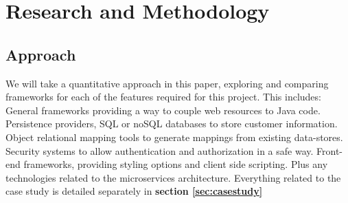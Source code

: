 \documentclass[12pt]{article}
\begin{document}
\section{Research and Methodology}
\begin{multicols}{2}
\subsection{Approach}
We will take a quantitative approach in this paper, exploring and comparing frameworks for each of the features required for this project. This includes: General frameworks providing a way to couple web resources to Java code. Persistence providers, SQL or noSQL databases to store customer information. Object relational mapping tools to generate mappings from existing data-stores. Security systems to allow authentication and authorization in a safe way. Front-end frameworks, providing styling options and client side scripting. Plus any technologies related to the microservices architecture. Everything related to the case study is detailed separately in \textbf{section \ref{sec:casestudy}}

\end{multicols}
\end{document}
